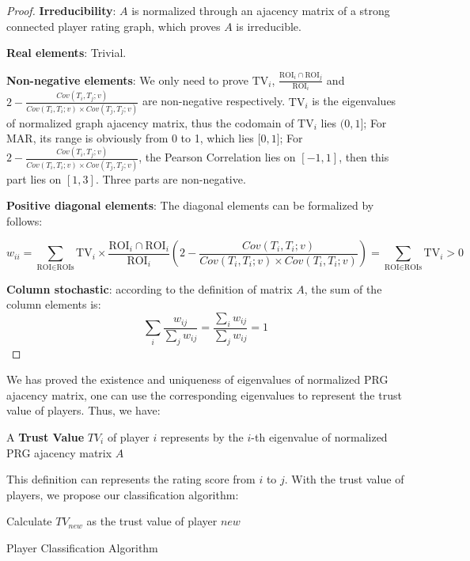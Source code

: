   \begin{proof}
  \textbf{Irreducibility}: $A$ is normalized through an ajacency matrix of a strong connected player
  rating graph, which proves $A$ is irreducible.

  \textbf{Real elements}: Trivial.
  
  \textbf{Non-negative elements}: We only need to prove $\text{TV}_i$, 
    $\frac{\text{ROI}_i\cap\text{ROI}_j}{\text{ROI}_i}$ and 
    $2-\frac{Cov(T_i, T_j; v)}{Cov(T_i, T_i; v)\times Cov(T_j, T_j; v)}$ are non-negative 
    respectively. $\text{TV}_i$ is the eigenvalues of normalized graph ajacency matrix, 
    thus the codomain of $\text{TV}_i$ lies $(0, 1\rbrack$; For MAR, its range is obviously from 0 to 1,
    which lies $\lbrack 0, 1 \rbrack$; For $2-\frac{Cov(T_i, T_j; v)}{Cov(T_i, T_i; v)\times Cov(T_j, T_j; v)}$,
    the Pearson Correlation lies on $[-1, 1]$, then this part lies on $[1, 3]$.
    Three parts are non-negative.
  
  \textbf{Positive diagonal elements}: The diagonal elements can be formalized by follows:

  \[
  w_{ii} = 
  \sum_{\text{ROI}\in\text{ROIs}}{
    \text{TV}_i \times
    \frac{\text{ROI}_i\cap\text{ROI}_i}{\text{ROI}_i}
    \left( 2-\frac{Cov(T_i, T_i; v)}
        {Cov(T_i, T_i; v)\times Cov(T_i, T_i; v)} \right)
  } = \sum_{\text{ROI}\in\text{ROIs}}{\text{TV}_i} > 0
  \]
  
  \textbf{Column stochastic}: according to the definition of matrix $A$, the sum of the column
  elements is:
  \[
    \sum_{i}{\frac{w_{ij}}{\sum_{j}{w_{ij}}}} 
    = \frac{\sum_{i}{w_{ij}}}{\sum_{j}{w_{ij}}} = 1
  \]
  \end{proof}

  We has proved the existence and uniqueness of eigenvalues of normalized PRG ajacency matrix, 
  one can use the corresponding eigenvalues to represent the trust value of players. Thus, we have:

  \begin{definition}
  A \textbf{Trust Value} $TV_i$ of player $i$ represents by the $i$-th eigenvalue of normalized PRG ajacency matrix $A$
  \end{definition}

  This definition can represents the rating score from $i$ to $j$. With the trust value of players,
  we propose our classification algorithm:

  \begin{algorithm}[H]
  \SetAlgoLined
  Calculate $TV_{new}$ as the trust value of player $new$ \;
  \caption{Player Classification Algorithm}
  \end{algorithm}

